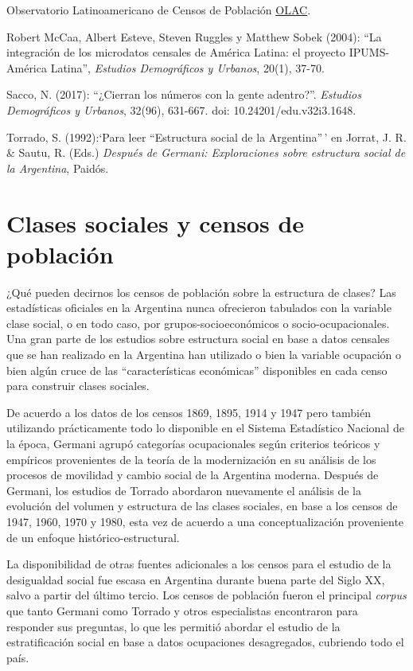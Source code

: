 \documentclass[
]{book}
\begin{document}
Observatorio Latinoamericano de Censos de Población \href{https://observatoriocensal.org/}{OLAC}.

Robert McCaa, Albert Esteve, Steven Ruggles y Matthew Sobek (2004): ``La integración de los microdatos censales de América Latina: el proyecto IPUMS-América Latina'', \emph{Estudios Demográficos y Urbanos}, 20(1), 37-70.

Sacco, N. (2017): ``¿Cierran los números con la gente adentro?''. \emph{Estudios Demográficos y Urbanos}, 32(96), 631-667. doi: 10.24201/edu.v32i3.1648.

Torrado, S. (1992):`Para leer ``Estructura social de la Argentina''\,' en Jorrat, J. R. \& Sautu, R. (Eds.) \emph{Después de Germani: Exploraciones sobre estructura social de la Argentina}, Paidós.

\hypertarget{clases3}{%
\section{Clases sociales y censos de población}\label{clases3}}

¿Qué pueden decirnos los censos de población sobre la estructura de clases? Las estadísticas oficiales en la Argentina nunca ofrecieron tabulados con la variable clase social, o en todo caso, por grupos-socioeconómicos o socio-ocupacionales. Una gran parte de los estudios sobre estructura social en base a datos censales que se han realizado en la Argentina han utilizado o bien la variable ocupación o bien algún cruce de las ``características económicas'' disponibles en cada censo para construir clases sociales.

De acuerdo a los datos de los censos 1869, 1895, 1914 y 1947 pero también utilizando prácticamente todo lo disponible en el Sistema Estadístico Nacional de la época, Germani \citeyearpar{Germani1987} agrupó categorías ocupacionales según criterios teóricos y empíricos provenientes de la teoría de la modernización en su análisis de los procesos de movilidad y cambio social de la Argentina moderna. Después de Germani, los estudios de Torrado \citetext{\citeyear{Torrado1992}; \citeyear{Torrado2003a}} abordaron nuevamente el análisis de la evolución del volumen y estructura de las clases sociales, en base a los censos de 1947, 1960, 1970 y 1980, esta vez de acuerdo a una conceptualización proveniente de un enfoque histórico-estructural.

La disponibilidad de otras fuentes adicionales a los censos para el estudio de la desigualdad social fue escasa en Argentina durante buena parte del Siglo XX, salvo a partir del último tercio. Los censos de población fueron el principal \emph{corpus} que tanto Germani como Torrado y otros especialistas encontraron para responder sus preguntas, lo que les permitió abordar el estudio de la estratificación social en base a datos ocupaciones desagregados, cubriendo todo el país.
\end{document}
